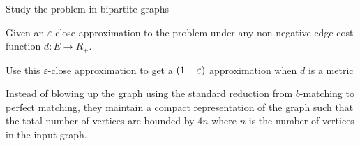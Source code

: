 \begin{desclist}
    \item Study the \minpbmatch{} problem in bipartite graphs 
    \item Given an $\varepsilon$-close approximation to the problem under any non-negative edge cost function $d \colon E \to R_+$. 
    \item Use this $\varepsilon$-close approximation to get a $\left( 1-\varepsilon \right)$ approximation when $d$ is a metric
    \item Instead of blowing up the graph using the standard reduction from $b$-matching to perfect matching, they maintain a compact representation of the graph such that the total number of vertices are bounded by $4n$
          where $n$ is the number of vertices in the input graph. 
\end{desclist}